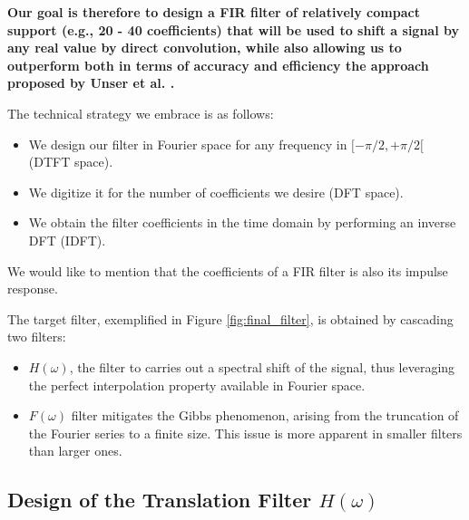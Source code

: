 \documentclass[]{usiinfbachelorproject}
\begin{document}
	\textbf{Our goal is therefore to design a FIR filter of relatively compact support (e.g., 20 - 40  coefficients) that will be used to shift a signal by any real value by  direct convolution, while also allowing us to outperform both in terms of accuracy and efficiency the approach proposed by Unser et al. \cite{main_article}.}
	
	
	The technical strategy we embrace is as follows: 
	\begin{itemize}
		\item We design our filter in Fourier space for any frequency in $[-\pi/2, +\pi/2[$ (DTFT space).
		\item We digitize it for the number of coefficients we desire (DFT space). 
		\item We obtain the filter coefficients in the time domain by performing an inverse DFT (IDFT).
	\end{itemize}
	We would like to mention that the coefficients of a FIR filter is also its impulse response.
	
	The target filter, exemplified in Figure \ref{fig:final_filter}, is obtained by cascading two filters:
	\begin{itemize}
		\item $H(\omega)$, the filter to carries out a spectral shift of the signal, thus leveraging the perfect interpolation property available in Fourier space.
		\item $F(\omega)$ filter mitigates the Gibbs phenomenon, arising from the truncation of the Fourier series to a finite size. This issue is more apparent in smaller filters than larger ones.
	\end{itemize}
	
	\subsection{Design of the Translation Filter $H(\omega)$}
	
\end{document}
